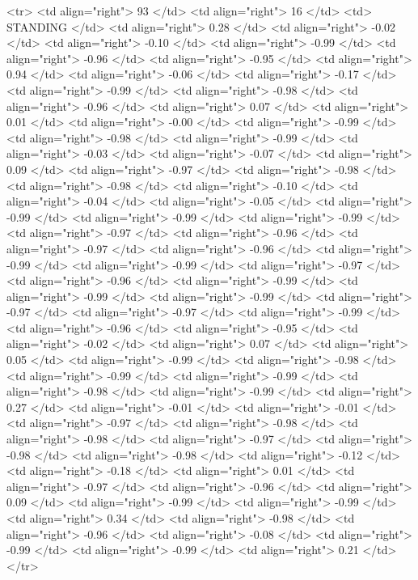   <tr> <td align="right"> 93 </td> <td align="right">  16 </td> <td> STANDING </td> <td align="right"> 0.28 </td> <td align="right"> -0.02 </td> <td align="right"> -0.10 </td> <td align="right"> -0.99 </td> <td align="right"> -0.96 </td> <td align="right"> -0.95 </td> <td align="right"> 0.94 </td> <td align="right"> -0.06 </td> <td align="right"> -0.17 </td> <td align="right"> -0.99 </td> <td align="right"> -0.98 </td> <td align="right"> -0.96 </td> <td align="right"> 0.07 </td> <td align="right"> 0.01 </td> <td align="right"> -0.00 </td> <td align="right"> -0.99 </td> <td align="right"> -0.98 </td> <td align="right"> -0.99 </td> <td align="right"> -0.03 </td> <td align="right"> -0.07 </td> <td align="right"> 0.09 </td> <td align="right"> -0.97 </td> <td align="right"> -0.98 </td> <td align="right"> -0.98 </td> <td align="right"> -0.10 </td> <td align="right"> -0.04 </td> <td align="right"> -0.05 </td> <td align="right"> -0.99 </td> <td align="right"> -0.99 </td> <td align="right"> -0.99 </td> <td align="right"> -0.97 </td> <td align="right"> -0.96 </td> <td align="right"> -0.97 </td> <td align="right"> -0.96 </td> <td align="right"> -0.99 </td> <td align="right"> -0.99 </td> <td align="right"> -0.97 </td> <td align="right"> -0.96 </td> <td align="right"> -0.99 </td> <td align="right"> -0.99 </td> <td align="right"> -0.99 </td> <td align="right"> -0.97 </td> <td align="right"> -0.97 </td> <td align="right"> -0.99 </td> <td align="right"> -0.96 </td> <td align="right"> -0.95 </td> <td align="right"> -0.02 </td> <td align="right"> 0.07 </td> <td align="right"> 0.05 </td> <td align="right"> -0.99 </td> <td align="right"> -0.98 </td> <td align="right"> -0.99 </td> <td align="right"> -0.99 </td> <td align="right"> -0.98 </td> <td align="right"> -0.99 </td> <td align="right"> 0.27 </td> <td align="right"> -0.01 </td> <td align="right"> -0.01 </td> <td align="right"> -0.97 </td> <td align="right"> -0.98 </td> <td align="right"> -0.98 </td> <td align="right"> -0.97 </td> <td align="right"> -0.98 </td> <td align="right"> -0.98 </td> <td align="right"> -0.12 </td> <td align="right"> -0.18 </td> <td align="right"> 0.01 </td> <td align="right"> -0.97 </td> <td align="right"> -0.96 </td> <td align="right"> 0.09 </td> <td align="right"> -0.99 </td> <td align="right"> -0.99 </td> <td align="right"> 0.34 </td> <td align="right"> -0.98 </td> <td align="right"> -0.96 </td> <td align="right"> -0.08 </td> <td align="right"> -0.99 </td> <td align="right"> -0.99 </td> <td align="right"> 0.21 </td> </tr>
